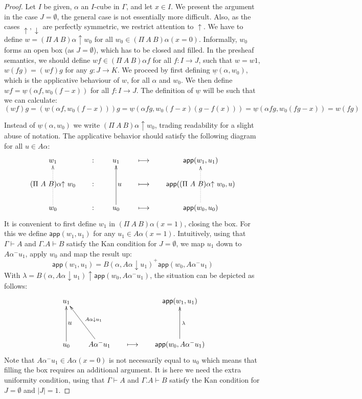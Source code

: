 \documentclass[10pt,a4paper]{article}
\newcommand{\app}{\mathsf{app}}
\newcommand{\es}{\emptyset}
\newcommand{\lto}{\longmapsto}
\newcommand{\rup}[1]{#1{\uparrow}}
\newcommand{\rdo}[1]{#1{\downarrow}}
\newcommand{\del}[1]{}
\newcommand{\ul}[1]{\underline{#1}}
\begin{document}
\begin{proof}
Let $I$ be given, $\alpha$ an $I$-cube in $\Gamma$, and let $x\in I$.
We present the argument in the case $J=\es$, the general case is not essentially more difficult.
Also, as the cases $\rup{},\rdo{}$ are perfectly symmetric, we restrict attention to $\rup{}$.
We have to define $w=\rup{(\Pi~A~B)\alpha} w_0$ for all $w_0 \in (\Pi~A~B)\alpha(x=0)$.
Informally, $w_0$ forms an open box (as $J=\es$), which has to be closed and filled.
In the presheaf semantics, we should define $wf\in(\Pi~A~B)\alpha f$ for all $f:I\to J$,
such that $w=w1$, $w(fg) = (wf)g$ for any $g:J\to K$.
We proceed by first defining $\ul{w}(\alpha,w_0)$, which is
the applicative behaviour of $w$, for all $\alpha$ and $w_0$.
We then define $wf=\ul{w}(\alpha f,w_0(f-x))$ for all $f:I\to J$.
The definition of $\ul{w}$ will be such that we can calculate:
\[
(wf)g = (\ul{w}(\alpha f,w_0(f-x)))g = \ul{w}(\alpha fg,w_0(f-x)(g-f(x))) =  \ul{w}(\alpha fg,w_0(fg-x)) = w(fg)
\]

Instead of  $\ul{w}(\alpha,w_0)$ we write $\rup{(\Pi~A~B)\alpha} w_0$,
trading readability for a slight abuse of notation.
The applicative behavior should satisfy the following diagram for all $u\in A\alpha$:
\[
\xymatrix@R=.6cm@C=.6cm{
w_1                                         &:&   u_1\del{\in A\alpha(x=1)}             &\lto &   \app(w_1,u_1)\del{\in B(\alpha(x=1),u_1)}  \\
\rup{(\Pi~A~B)\alpha}~w_0 &:&    ~~~u\del{\in A\alpha}                  &\lto &    \app(\rup{(\Pi~A~B)\alpha}~w_0,u)\del{\in B(\alpha,u)}   \\
w_0\ar@{.>}[uu]                   &:&    u_0\del{\in A\alpha(x=0)}\ar[uu] &\lto &    \app(w_0,u_0)\del{\in B(\alpha(x=0),u_0)}\ar@{.>}[uu]   \\
}
\]
It is convenient to first define $w_1$ in $(\Pi~A~B)\alpha(x=1)$, closing the box.
For this we define $\app(w_1,u_1)$ for any $u_1\in A\alpha(x=1)$.
Intuitively, using that $\Gamma\vdash A$ and $\Gamma.A\vdash B$ satisfy the Kan
condition for $J=\es$, we map $u_1$ down to $A\alpha^- u_1$,
apply $w_0$ and map the result up:
$$
\app(w_1,u_1) = B(\alpha,\rdo{A\alpha}u_1)^+\app(w_0,A\alpha^- u_1)
$$
With $\lambda=\rup{B(\alpha,\rdo{A\alpha}u_1)} \app(w_0,A\alpha^- u_1)$, the situation can be depicted as follows:
\[
\xymatrix@R=.6cm@C=.6cm{
 u_1            && &   \app(w_1,u_1)  \\
 ~~~u               && &    \\
u_0\ar[uu]      &A\alpha^- u_1\ar[uul]_{\rdo{A\alpha}u_1}&\lto &    \app(w_0,A\alpha^- u_1)\ar[uu]_\lambda  \\
}
\]
Note that $A\alpha^- u_1 \in A\alpha(x=0)$ is not necessarily equal to $u_0$
which means that filling the box requires an additional argument.
It is here we need the extra uniformity condition,
using that $\Gamma\vdash A$ and
$\Gamma.A\vdash B$ satisfy the Kan condition for $J=\es$ and $|J|=1$.


\end{proof}
\end{document}
